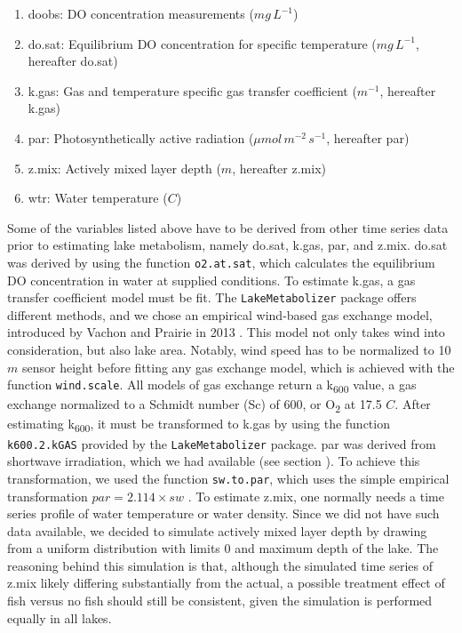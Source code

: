 \documentclass[11pt,lineno]{manuscript}\usepackage[]{graphicx}\usepackage[]{xcolor}
\begin{document}
\begin{enumerate}
\item doobs: DO concentration measurements ($mg\,L^{-1}$)
\item do.sat: Equilibrium DO concentration for specific temperature ($mg\,L^{-1}$, hereafter do.sat)
\item k.gas: Gas and temperature specific gas transfer coefficient ($m^{-1}$, hereafter k.gas)
\item par: Photosynthetically active radiation ($\mu{}mol\,m^{-2}\,s^{-1}$, hereafter par)
\item z.mix: Actively mixed layer depth ($m$, hereafter z.mix)
\item wtr: Water temperature (\textdegree{}$C$)
\end{enumerate}

Some of the variables listed above have to be derived from other time series data prior
to estimating lake metabolism,
namely do.sat, k.gas, par, and z.mix.
do.sat was derived by using the function \texttt{o2.at.sat}, which calculates
the equilibrium DO concentration in water at supplied conditions.
To estimate k.gas, a gas transfer coefficient model must be fit.
The \texttt{LakeMetabolizer} package offers different methods, and we chose
an empirical wind-based gas exchange model, introduced by Vachon and
Prairie in 2013 \citep{Vachon:2013}. This model not only takes wind into
consideration, but also lake area. Notably, wind speed has to be normalized
to 10 $m$ sensor height before fitting any gas exchange model, which is achieved
with the function \texttt{wind.scale}.
All models of gas exchange 
return a k\textsubscript{600} value, a gas exchange normalized to a Schmidt 
number (Sc) of 600, or O\textsubscript{2} at 17.5 \textdegree{}$C$.
After estimating k\textsubscript{600}, it must be transformed to k.gas by using the
function \texttt{k600.2.kGAS} provided by the \texttt{LakeMetabolizer}
package. par was derived from shortwave irradiation,
which we had available (see section ).
To achieve this transformation, we used the function \texttt{sw.to.par},
which uses the simple empirical transformation $par = 2.114 \times sw$ \citep{Britton:1976}.
To estimate z.mix, one normally needs a time series profile of water temperature
or water density. Since we did not have such data available, we decided to
simulate actively mixed layer depth by drawing from a uniform distribution
with limits 0 and maximum depth of the lake. The reasoning behind this simulation
is that, although the simulated time series of z.mix likely differing substantially
from the actual, a possible treatment effect of fish versus no fish should still be
consistent, given the simulation is performed equally in all lakes.\smallskip
\end{document}
